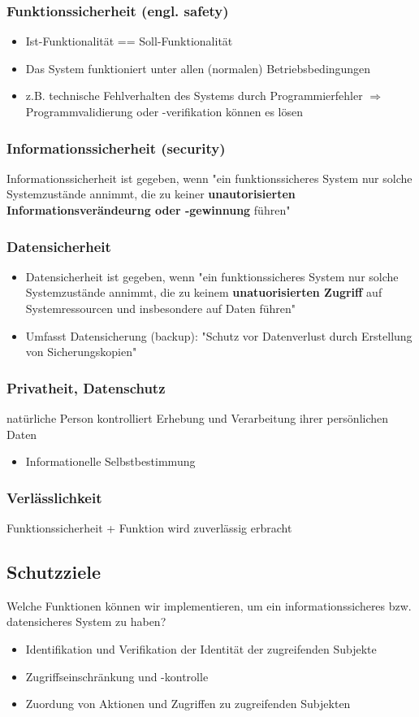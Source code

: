 \documentclass{article}
\begin{document}
\subsubsection{Funktionssicherheit (engl. safety)}
\begin{itemize}
    \item Ist-Funktionalität == Soll-Funktionalität
    \item Das System funktioniert unter allen (normalen) Betriebsbedingungen
    \item z.B. technische Fehlverhalten des Systems durch Programmierfehler $\Rightarrow$ Programmvalidierung oder -verifikation können es lösen
\end{itemize}
\subsubsection{Informationssicherheit (security)}
    Informationssicherheit ist gegeben, wenn "ein funktionssicheres System nur solche Systemzustände annimmt, die zu keiner \textbf{unautorisierten Informationsverändeurng oder -gewinnung} führen"
\subsubsection{Datensicherheit}
\begin{itemize}
    \item Datensicherheit ist gegeben, wenn "ein funktionssicheres System nur solche Systemzustände annimmt, die zu keinem \textbf{unatuorisierten Zugriff} auf Systemressourcen und insbesondere auf Daten führen"
    \item Umfasst Datensicherung (backup): "Schutz vor Datenverlust durch Erstellung von Sicherungskopien"
\end{itemize}
\subsubsection{Privatheit, Datenschutz}
natürliche Person kontrolliert Erhebung und Verarbeitung ihrer persönlichen Daten
\begin{itemize}
    \item Informationelle Selbstbestimmung
\end{itemize}
\subsubsection{Verlässlichkeit}
Funktionssicherheit + Funktion wird zuverlässig erbracht 
\subsection{Schutzziele}
Welche Funktionen können wir implementieren, um ein informationssicheres bzw. datensicheres System zu haben?
\begin{itemize}
    \item Identifikation und Verifikation der Identität der zugreifenden Subjekte
    \item Zugriffseinschränkung und -kontrolle
    \item Zuordung von Aktionen und Zugriffen zu zugreifenden Subjekten
\end{itemize}
\end{document}
